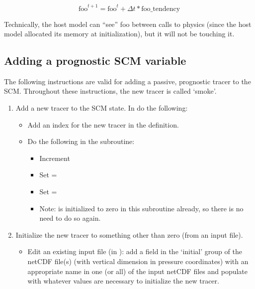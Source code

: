 \begin{equation}
\text{foo}^{t+1} = \text{foo}^t + \Delta t*\text{foo\_tendency} 
\end{equation}

Technically, the host model can ``see'' foo between calls to physics (since the host model allocated its memory at initialization), but it will not be touching it.

\subsection{Adding a prognostic SCM variable}

The following instructions are valid for adding a passive, prognostic tracer to the SCM. Throughout these instructions, the new tracer is called `smoke'.

\begin{enumerate}
\item Add a new tracer to the SCM state. In  do the following:
	\begin{itemize}
	\item Add an index for the new tracer in the  definition.
	\item Do the following in the  subroutine:
		\begin{itemize}
		\item Increment 
		\item Set  = 
		\item Set  = 
		\item Note:  is initialized to zero in this subroutine already, so there is no need to do so again.
		\end{itemize}
	\end{itemize}
\item Initialize the new tracer to something other than zero (from an input file).
	\begin{itemize}
	\item Edit an existing input file (in ): add a field in the `initial' group of the netCDF file(s) (with vertical dimension in pressure coordinates) with an appropriate name in one (or all) of the input netCDF files and populate with whatever values are necessary to initialize the new tracer.

\end{itemize}
\end{enumerate}
